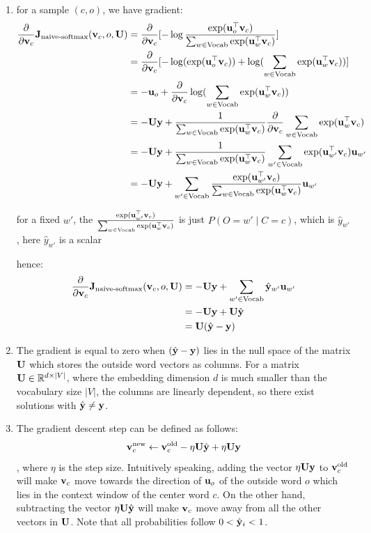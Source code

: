 \begin{parts}
{\begin{enumerate}[label=\roman*.]
    \item 
    for a sample $(c, o)$, we have gradient: \\
    \begin{align}
    \frac{\partial}{\partial \mathbf{v}_c} \mathbf{J}_{\text{naive-softmax}}(\mathbf{v}_c, o, \mathbf{U})
    &= \frac{\partial}{\partial \mathbf{v}_c} [-\log\frac{\exp(\mathbf{u}_{o}^\top \mathbf{v}_c)}{\sum_{w \in \text{Vocab}} \exp(\mathbf{u}_{w}^\top \mathbf{v}_c)}] \\
    &= \frac{\partial}{\partial \mathbf{v}_c} [-\log(\exp(\mathbf{u}_{o}^\top \mathbf{v}_c)) + \log(\sum_{w \in \text{Vocab}} \exp(\mathbf{u}_{w}^\top \mathbf{v}_c))] \\
    &= -\mathbf{u}_o + \frac{\partial}{\partial \mathbf{v}_c} \log(\sum_{w \in \text{Vocab}} \exp(\mathbf{u}_{w}^\top \mathbf{v}_c)) \\
    &= -\mathbf{U}\mathbf{y} + \frac{1}{\sum_{w \in \text{Vocab}} \exp(\mathbf{u}_{w}^\top \mathbf{v}_c)} \frac{\partial}{\partial \mathbf{v}_c} \sum_{w \in \text{Vocab}} \exp(\mathbf{u}_{w}^\top \mathbf{v}_c) \\
    &= -\mathbf{U}\mathbf{y} + \frac{1}{\sum_{w \in \text{Vocab}} \exp(\mathbf{u}_{w}^\top \mathbf{v}_c)} \sum_{w' \in \text{Vocab}} \exp(\mathbf{u}_{w'}^\top \mathbf{v}_c)\mathbf{u}_{w'} \\
    &= -\mathbf{U}\mathbf{y} + \sum_{w' \in \text{Vocab}} \frac{\exp(\mathbf{u}_{w'}^\top \mathbf{v}_c)}{\sum_{w \in \text{Vocab}} \exp(\mathbf{u}_{w}^\top \mathbf{v}_c)} \mathbf{u}_{w'}
    \end{align}

for a fixed $w'$, the $\frac{\exp(\mathbf{u}_{w'}^\top \mathbf{v}_c)}{\sum_{w \in \text{Vocab}} \exp(\mathbf{u}_{w}^\top \mathbf{v}_c)}$ is just $P(O=w' \mid C=c)$, which is $\hat{y}_{w'}$, here $\hat{y}_{w'}$ is a scalar

hence:
    \begin{align}
    \frac{\partial}{\partial \mathbf{v}_c} \mathbf{J}_{\text{naive-softmax}}(\mathbf{v}_c, o, \mathbf{U})
    &= -\mathbf{U}\mathbf{y} + \sum_{w' \in \text{Vocab}} \hat{\mathbf{y}}_{w'} \mathbf{u}_{w'} \\
    &= -\mathbf{U}\mathbf{y} + \mathbf{U}\hat{\mathbf{y}} \\
    &= \mathbf{U}(\hat{\mathbf{y}} - \mathbf{y})
    \end{align}

    \item
    The gradient is equal to zero when $(\hat{\mathbf{y}} - \mathbf{y})$ lies in the null space of the matrix $\mathbf{U}$ which stores the outside word vectors as columns. For a matrix $\mathbf{U} \in \mathbb{R}^{d \times |V|}$, where the embedding dimension $d$ is much smaller than the vocabulary size $|V|$, the columns are linearly dependent, so there exist solutions with $\hat{\mathbf{y}} \ne \mathbf{y}$.
    
    \item
    The gradient descent step can be defined as follows:
    $$
        \mathbf{v}_c^{\text{new}} \gets \mathbf{v}_c^{\text{old}} - \eta \mathbf{U}\hat{\mathbf{y}} + \eta \mathbf{U}\mathbf{y}
    $$
    , where $\eta$ is the step size. Intuitively speaking, adding the vector $\eta \mathbf{U}\mathbf{y}$ to $\mathbf{v}_c^{\text{old}}$ will make $\mathbf{v}_c$ move towards the direction of $\mathbf{u}_o$ of the outside word $o$ which lies in the context window of the center word $c$. On the other hand, subtracting the vector $\eta \mathbf{U}\hat{\mathbf{y}}$ will make $\mathbf{v}_c$ move away from all the other vectors in $\mathbf{U}$. Note that all probabilities follow $0 < \hat{\mathbf{y}}_i < 1$.


\end{enumerate}}
\end{parts}

